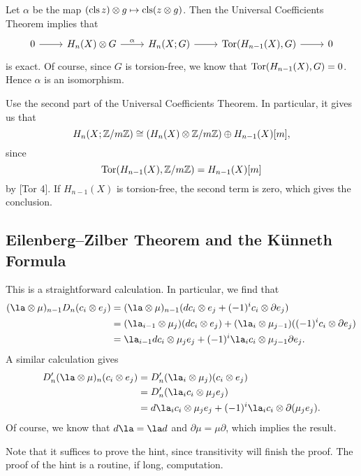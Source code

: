 \documentclass[../../solutions.tex]{subfiles}
\begin{document}
\begin{exercise} \leavevmode
Let $\alpha$ be the map $(\operatorname{cls} z)\otimes g\mapsto\operatorname{cls}(z\otimes g)$.
Then the Universal Coefficients Theorem implies that
\[
\begin{tikzcd}
0\ar[r] & H_n(X)\otimes G\ar[r,"\alpha"] & H_n(X;G)\ar[r] & \Tor(H_{n-1}(X),G)\ar[r] & 0
\end{tikzcd}
\]
is exact.
Of course, since $G$ is torsion-free, we know that $\operatorname{Tor}(H_{n-1}(X),G)=0$.
Hence $\alpha$ is an isomorphism.
\end{exercise}

\begin{exercise} \leavevmode
Use the second part of the Universal Coefficients Theorem.
In particular, it gives us that
\[H_n(X;\mathbb{Z}/m\mathbb{Z})\cong(H_n(X)\otimes\mathbb{Z}/m\mathbb{Z})\oplus H_{n-1}(X)[m],\]
since
\[\operatorname{Tor}(H_{n-1}(X),\mathbb{Z}/m\mathbb{Z})=H_{n-1}(X)[m]\]
by [Tor 4].
If $H_{n-1}(X)$ is torsion-free, the second term is zero, which gives the conclusion.
\end{exercise}

\subsection{Eilenberg--Zilber Theorem and the K\"unneth Formula}
\begin{exercise} \leavevmode
This is a straightforward calculation.
In particular, we find that 
\begin{align*}
(\la\otimes\mu)_{n-1}D_n(c_i\otimes e_j)&=(\la\otimes\mu)_{n-1}(dc_i\otimes e_j+(-1)^ic_i\otimes\partial e_j)\\
&=(\la_{i-1}\otimes\mu_j)(dc_i\otimes e_j)+(\la_i\otimes\mu_{j-1})((-1)^ic_i\otimes\partial e_j)\\
&=\la_{i-1}dc_i\otimes\mu_je_j+(-1)^i\la_ic_i\otimes\mu_{j-1}\partial e_j.
\end{align*}
A similar calculation gives
\begin{align*}
D'_n(\la\otimes\mu)_n(c_i\otimes e_j)&=D'_n(\la_i\otimes\mu_j)(c_i\otimes e_j)\\
&=D'_n(\la_ic_i\otimes\mu_je_j)\\
&=d\la_ic_i\otimes\mu_j e_j+(-1)^i\la_ic_i\otimes\partial(\mu_je_j).
\end{align*}
Of course, we know that $d\la=\la d$ and $\partial \mu=\mu\partial$, which implies the result.
\end{exercise}

\begin{exercise} \leavevmode
Note that it suffices to prove the hint, since transitivity will finish the proof.
The proof of the hint is a routine, if long, computation.
\end{exercise}
\end{document}
